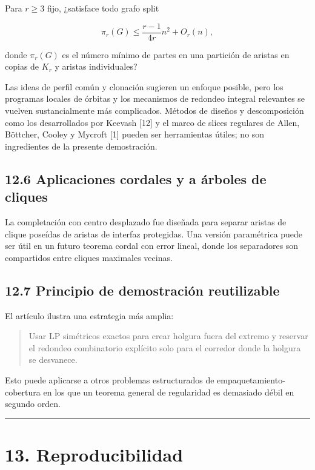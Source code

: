 \documentclass[
  11pt,
]{article}
\begin{document}
Para \(r\ge3\) fijo, ¿satisface todo grafo split

\[
\pi_r(G)
\le
\frac{r-1}{4r}n^2+O_r(n),
\]

donde \(\pi_r(G)\) es el número mínimo de partes en una partición de
aristas en copias de \(K_r\) y aristas individuales?

Las ideas de perfil común y clonación sugieren un enfoque posible, pero
los programas locales de órbitas y los mecanismos de redondeo integral
relevantes se vuelven sustancialmente más complicados. Métodos de
diseños y descomposición como los desarrollados por Keevash {[}12{]} y
el marco de slices regulares de Allen, Böttcher, Cooley y Mycroft
{[}1{]} pueden ser herramientas útiles; no son ingredientes de la
presente demostración.

\subsection{12.6 Aplicaciones cordales y a árboles de
cliques}\label{aplicaciones-cordales-y-a-uxe1rboles-de-cliques}

La completación con centro desplazado fue diseñada para separar aristas
de clique poseídas de aristas de interfaz protegidas. Una versión
paramétrica puede ser útil en un futuro teorema cordal con error lineal,
donde los separadores son compartidos entre cliques maximales vecinas.

\subsection{12.7 Principio de demostración
reutilizable}\label{principio-de-demostraciuxf3n-reutilizable}

El artículo ilustra una estrategia más amplia:

\begin{quote}
Usar LP simétricos exactos para crear holgura fuera del extremo y
reservar el redondeo combinatorio explícito solo para el corredor donde
la holgura se desvanece.
\end{quote}

Esto puede aplicarse a otros problemas estructurados de
empaquetamiento-cobertura en los que un teorema general de regularidad
es demasiado débil en segundo orden.

\begin{center}\rule{0.5\linewidth}{0.5pt}\end{center}

\section{13. Reproducibilidad}\label{reproducibilidad}
\end{document}
